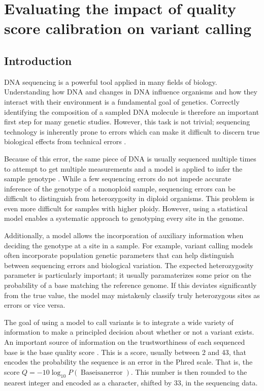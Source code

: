 \chapter{Evaluating the impact of quality score calibration on variant calling}
\label{ch:evaluating}
\section{Introduction}

DNA sequencing is a powerful tool applied in many fields of biology. Understanding how DNA and changes in DNA influence organisms and how they interact with their environment is a fundamental goal of genetics. Correctly identifying the composition of a sampled DNA molecule is therefore an important first step for many genetic studies. However, this task is not trivial; sequencing technology is inherently prone to errors which can make it difficult to discern true biological effects from technical errors \parencite{fox_accuracy_2014, wu_estimating_2017}. 

Because of this error, the same piece of DNA is usually sequenced multiple times to attempt to get multiple measurements and a model is applied to infer the sample genotype \parencite{li_statistical_2011, garrison_haplotype-based_2012, poplin_scaling_2018}. While a few sequencing errors do not impede accurate inference of the genotype of a monoploid sample, sequencing errors can be difficult to distinguish from heterozygosity in diploid organisms. This problem is even more difficult for samples with higher ploidy. However, using a statistical model enables a systematic approach to genotyping every site in the genome.

Additionally, a model allows the incorporation of auxiliary information when deciding the genotype at a site in a sample. For example, variant calling models often incorporate population genetic parameters that can help distinguish between sequencing errors and biological variation. The expected heterozygosity parameter \theta is particularly important; it usually paramaterizes some prior on the probability of a base matching the reference genome. If this deviates significantly from the true value, the model may mistakenly classify truly heterozygous sites as errors or vice versa.

The goal of using a model to call variants is to integrate a wide variety of information to make a principled decision about whether or not a variant exists. An important source of information on the trustworthiness of each sequenced base is the base quality score \parencite{ewing_base-calling_1998, ewing_base-calling_1998-1}. This is a score, usually between 2 and 43, that encodes the probability the sequence is an error in the Phred scale. That is, the score $Q = -10\log_{10}P(\operatorname{Base is an error})$. This number is then rounded to the nearest integer and encoded as a character, shifted by 33, in the sequencing data.

